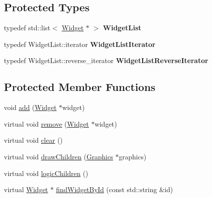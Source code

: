 \subsection*{Protected Types}
\begin{DoxyCompactItemize}
\item 
typedef std\+::list$<$ \hyperlink{classgcn_1_1Widget}{Widget} $\ast$ $>$ {\bfseries Widget\+List}\hypertarget{classgcn_1_1BasicContainer_a64f7237f6c610efba3e4928b09ee67d2}{}\label{classgcn_1_1BasicContainer_a64f7237f6c610efba3e4928b09ee67d2}

\item 
typedef Widget\+List\+::iterator {\bfseries Widget\+List\+Iterator}\hypertarget{classgcn_1_1BasicContainer_ad3791ca5ff8504602eaa0110d36f4822}{}\label{classgcn_1_1BasicContainer_ad3791ca5ff8504602eaa0110d36f4822}

\item 
typedef Widget\+List\+::reverse\+\_\+iterator {\bfseries Widget\+List\+Reverse\+Iterator}\hypertarget{classgcn_1_1BasicContainer_a6bda9a182a96ce1b7cad9e271c14cfb0}{}\label{classgcn_1_1BasicContainer_a6bda9a182a96ce1b7cad9e271c14cfb0}

\end{DoxyCompactItemize}
\subsection*{Protected Member Functions}
\begin{DoxyCompactItemize}
\item 
void \hyperlink{classgcn_1_1BasicContainer_a27d6058336a2573b6cea6e947c8d69bd}{add} (\hyperlink{classgcn_1_1Widget}{Widget} $\ast$widget)
\item 
virtual void \hyperlink{classgcn_1_1BasicContainer_a1e834058961f0cf6d1eea415ca509b10}{remove} (\hyperlink{classgcn_1_1Widget}{Widget} $\ast$widget)
\item 
virtual void \hyperlink{classgcn_1_1BasicContainer_a6b494b3e7c7369efcfc0e3f2f964bcf8}{clear} ()
\item 
virtual void \hyperlink{classgcn_1_1BasicContainer_a0e16996a51b1364875e9c48fe5c12bae}{draw\+Children} (\hyperlink{classgcn_1_1Graphics}{Graphics} $\ast$graphics)
\item 
virtual void \hyperlink{classgcn_1_1BasicContainer_a2d29dcdef360e36a3061aafccb407f28}{logic\+Children} ()
\item 
virtual \hyperlink{classgcn_1_1Widget}{Widget} $\ast$ \hyperlink{classgcn_1_1BasicContainer_a4c734912bb5342259dc7bd77d606bd7e}{find\+Widget\+By\+Id} (const std\+::string \&id)
\end{DoxyCompactItemize}
